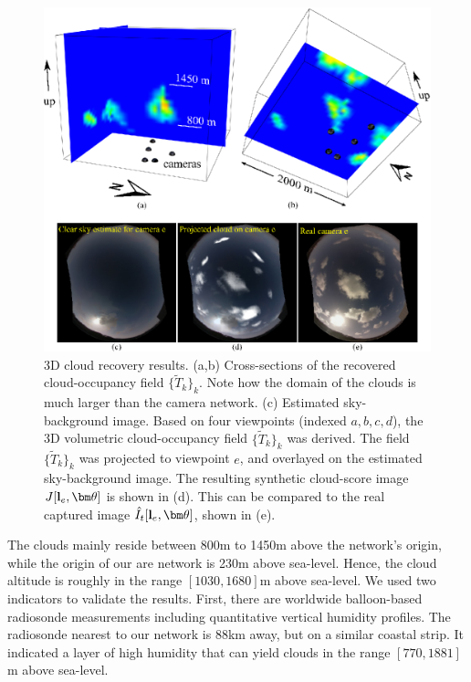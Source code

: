 \documentclass[runningheads]{llncs}
\begin{document}
\begin{figure}[t!]
\begin{center}
   \includegraphics[width=1\linewidth]{figures/clouds_reconstructions.eps}
\end{center}
   \vspace{-0.6cm}
   \caption{3D cloud recovery results. (a,b) Cross-sections of the recovered cloud-occupancy field $\{\tilde T_k\}_k$. Note how the domain of the clouds is much larger than the camera network. (c) Estimated sky-background image.  Based on four viewpoints (indexed $a,b,c,d$), the 3D volumetric cloud-occupancy field $\{\tilde T_k\}_k$ was derived. The field $\{\tilde T_k\}_k$ was projected to viewpoint $e$, and overlayed on the estimated sky-background image. The resulting synthetic cloud-score image $J[{\bf l}_e,{\bm \theta}]$ is shown in (d). This can be compared to the real captured image $\hat I_t[{\bf l}_e,{\bm \theta}]$, shown in (e).}
\label{fig:projection}
\end{figure}
The clouds mainly reside between 800m to 1450m above the network's origin, while the origin of our are network is 230m above sea-level. Hence, the cloud altitude is roughly in the range $[1030,1680]$m above sea-level. We used two indicators to validate the results. First, there are worldwide balloon-based radiosonde measurements including quantitative vertical humidity profiles. The radiosonde nearest to our network is 88km away, but on a similar coastal strip. It indicated a layer of high humidity that can yield clouds in the range $[770,1881]$m above sea-level.
\end{document}
